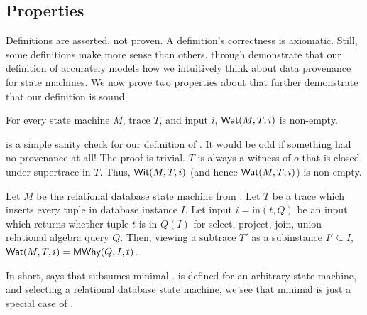 \subsection{\WatProvenance{} Properties}
Definitions are asserted, not proven. A definition's correctness is axiomatic.
Still, some definitions make more sense than others.
 through  demonstrate
that our definition of \watprovenance{} accurately models how we intuitively
think about data provenance for state machines. We now prove two properties
about \watprovenance{} that further demonstrate that our definition is sound.

\begin{theorem}
  For every state machine $M$, trace $T$, and input $i$, $\textsf{Wat}(M, T, i)$ is
  non-empty.
\end{theorem}

 is a simple sanity check for our definition of
\watprovenance{}. It would be odd if something had no provenance at all! The
proof is trivial. $T$ is always a witness of $o$ that is closed under
supertrace in $T$. Thus, $\textsf{Wit}(M, T, i)$ (and hence $\textsf{Wat}(M, T, i)$) is
non-empty.

\newcommand{\Min}{\text{in}}
\begin{theorem}
  Let $M$ be the relational database state machine from
  . Let $T$ be a trace which inserts every tuple in
  database instance $I$. Let input $i = \Min(t, Q)$ be an input which returns
  whether tuple $t$ is in $Q(I)$ for select, project, join, union relational
  algebra query $Q$. Then, viewing a subtrace $T'$ as a subinstance $I'
  \subseteq I$, $\textsf{Wat}(M, T, i) = \textsf{MWhy}(Q, I, t)$.
\end{theorem}

In short,  says that \watprovenance{} subsumes
minimal \whyprovenance{}. \Watprovenance{} is defined for an arbitrary state
machine, and selecting a relational database state machine, we see that minimal
\whyprovenance{} is just a special case of \watprovenance{}.

